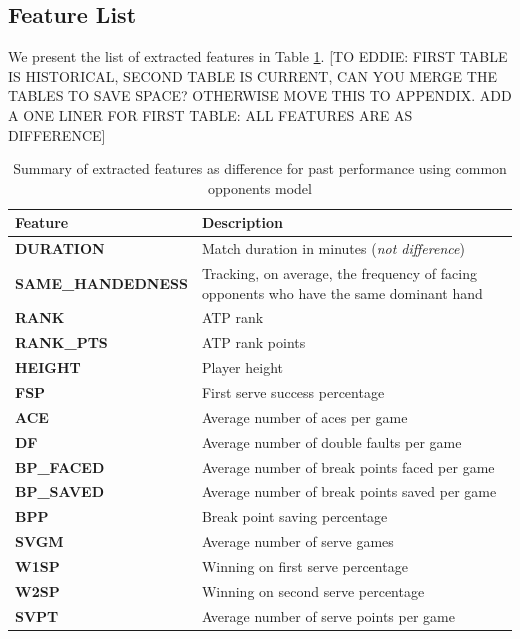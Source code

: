 \documentclass[paper=a4, fontsize=11pt]{scrartcl} %
\numberwithin{equation}{section} %
\numberwithin{figure}{section} %
\numberwithin{table}{section} %
\begin{document}
\subsection{Feature List}
We present the list of extracted features in Table \ref{tab:features}.  [TO EDDIE: FIRST TABLE IS HISTORICAL, SECOND TABLE IS CURRENT, CAN YOU MERGE THE TABLES TO SAVE SPACE? OTHERWISE MOVE THIS TO APPENDIX.  ADD A ONE LINER FOR FIRST TABLE: ALL FEATURES ARE AS DIFFERENCE]
\begin{center}
\begin{table}[h]
    \begin{tabular}{  l | p{10cm} }
    \hline
    Feature  & Description \\ \hline
    \textbf{DURATION}  & Match duration in minutes (\textit{not difference}) \\ \hline
    \textbf{SAME\_HANDEDNESS}  & Tracking, on average, the frequency of facing opponents who have the same dominant hand \\ \hline
    \textbf{RANK}  & ATP rank \\ \hline
    \textbf{RANK\_PTS}  & ATP rank points \\ \hline
    \textbf{HEIGHT}  & Player height \\ \hline
    \textbf{FSP}  & First serve success percentage \\ \hline
    \textbf{ACE}  & Average number of aces per game \\ \hline
    \textbf{DF}  & Average number of double faults per game \\ \hline
    \textbf{BP\_FACED}  & Average number of break points faced per game \\ \hline
    \textbf{BP\_SAVED}  & Average number of break points saved per game \\ \hline
    \textbf{BPP}  & Break point saving percentage \\ \hline
    \textbf{SVGM}  & Average number of serve games \\ \hline
    \textbf{W1SP}  & Winning on first serve percentage \\ \hline
    \textbf{W2SP}  & Winning on second serve percentage \\ \hline
    \textbf{SVPT}  & Average number of serve points per game \\ \hline
    \end{tabular}
    \caption{Summary of extracted features as difference for past performance using common opponents model}
    \label{tab:features}
    \end{table}
\end{center}
\end{document}
